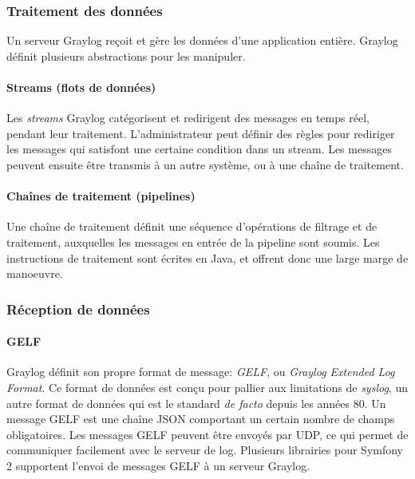             \subsubsection{Traitement des données}
                
                Un serveur Graylog reçoit et gère les données d'une application entière. Graylog définit plusieurs abstractions pour les manipuler.
                
                \paragraph{Streams (flots de données)} 
                    Les \emph{streams} Graylog catégorisent et redirigent des messages en temps réel, pendant leur traitement. L'administrateur peut définir des règles pour rediriger les messages qui satisfont une certaine condition dans un stream. Les messages peuvent ensuite être transmis à un autre système, ou à une chaîne de traitement.

                \paragraph{Chaînes de traitement (pipelines)}
                    Une chaîne de traitement définit une séquence d'opérations de filtrage et de traitement, auxquelles les messages en entrée de la pipeline sont soumis. Les instructions de traitement sont écrites en Java, et offrent donc une large marge de manoeuvre.


            \subsubsection{Réception de données}

                \paragraph{GELF}
                    Graylog définit son propre format de message: \emph{GELF}, ou \emph{Graylog Extended Log Format}. Ce format de données est conçu pour pallier aux limitations de \emph{syslog}, un autre format de données qui est le standard \emph{de facto} depuis les années 80. Un message GELF est une chaîne JSON comportant un certain nombre de champs obligatoires. Les messages GELF peuvent être envoyés par UDP, ce qui permet de communiquer facilement avec le serveur de log. Plusieurs librairies pour Symfony 2 supportent l'envoi de messages GELF à un serveur Graylog.

